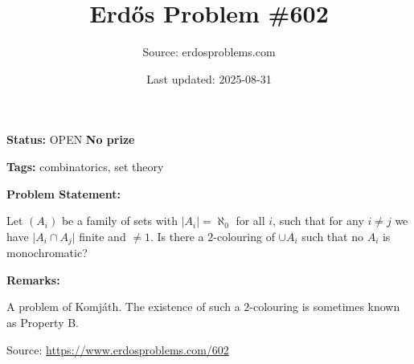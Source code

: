 \documentclass{article}
\title{Erd\H{o}s Problem \#602}
\date{Last updated: 2025-08-31}
\author{Source: erdosproblems.com}
\begin{document}
\maketitle

\noindent\textbf{Status:} OPEN \quad \textbf{No prize}

\noindent\textbf{Tags:} combinatorics, set theory

\medskip
\noindent\textbf{Problem Statement:}

Let $(A_i)$ be a family of sets with $\lvert A_i\rvert=\aleph_0$ for all $i$, such that for any $i\neq j$ we have $\lvert A_i\cap A_j\rvert$ finite and $\neq 1$. Is there a $2$-colouring of $\cup A_i$ such that no $A_i$ is monochromatic?

\bigskip
\noindent\textbf{Remarks:}

A problem of Komj\'{a}th. The existence of such a $2$-colouring is sometimes known as Property B.

\bigskip
\noindent\small{Source: \url{https://www.erdosproblems.com/602}}
\end{document}
